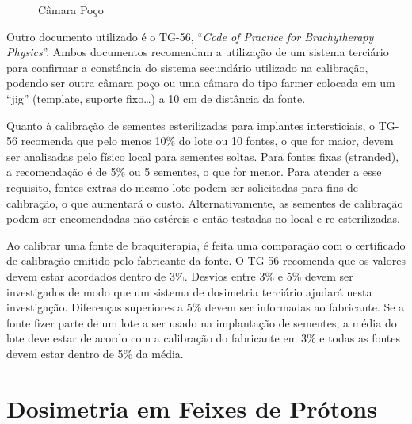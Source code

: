 \documentclass[11pt,a4paper]{article}
\begin{document}
	\begin{figure}
		\centering
		\caption{Câmara Poço}
		\label{fig:camaraPoco}
	\end{figure}

	Outro documento utilizado é o TG-56, ``\textit{Code of Practice for Brachytherapy Physics}''. Ambos documentos recomendam a utilização de um sistema terciário para confirmar a constância do sistema secundário utilizado na calibração, podendo ser outra câmara poço ou uma câmara do tipo farmer colocada em um ``jig'' (template, suporte fixo\dots) a 10 cm de distância da fonte.

	Quanto à calibração de sementes esterilizadas para implantes intersticiais, o TG-56 recomenda que pelo menos 10\% do lote ou 10 fontes, o que for maior, devem ser analisadas pelo físico local para sementes soltas. Para fontes fixas (stranded), a recomendação é de 5\% ou 5 sementes, o que for menor. Para atender a esse requisito, fontes extras do mesmo lote podem ser solicitadas para fins de calibração, o que aumentará o custo. Alternativamente, as sementes de calibração podem ser encomendadas não estéreis e então testadas no local e re-esterilizadas.

	Ao calibrar uma fonte de braquiterapia, é feita uma comparação com o certificado de calibração emitido pelo fabricante da fonte. O TG-56 recomenda que os valores devem estar acordados dentro de 3\%. Desvios entre 3\% e 5\% devem ser investigados de modo que um sistema de dosimetria terciário ajudará nesta investigação. Diferenças superiores a 5\% devem ser informadas ao fabricante. Se a fonte fizer parte de um lote a ser usado na implantação de sementes, a média do lote deve estar de acordo com a calibração do fabricante em 3\% e todas as fontes devem estar dentro de 5\% da média.

\section{Dosimetria em Feixes de Prótons}
\end{document}
